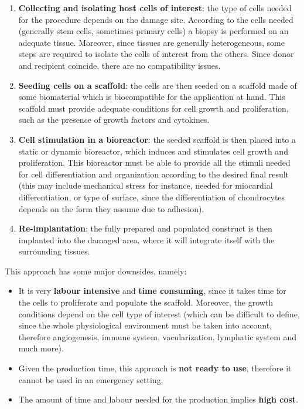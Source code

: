   \begin{multicols}{2}
    \begin{enumerate}
      \item \textbf{Collecting and isolating host cells of interest}: the type of cells needed for the procedure depends on the damage site.
        According to the cells needed (generally stem cells, sometimes primary cells) a biopsy is performed on an adequate tissue.
        Moreover, since tissues are generally heterogeneous, some steps are required to isolate the cells of interest from the others.
        Since donor and recipient coincide, there are no compatibility issues.
      \item \textbf{Seeding cells on a scaffold}: the cells are then seeded on a scaffold made of some biomaterial which is biocompatible for the application at hand.
        This scaffold must provide adequate conditions for cell growth and proliferation, such as the presence of growth factors and cytokines.
      \item \textbf{Cell stimulation in a bioreactor}: the seeded scaffold is then placed into a static or dynamic bioreactor, which induces and stimulates cell growth and proliferation.
        This bioreactor must be able to provide all the stimuli needed for cell differentiation and organization according to the desired final result (this may include mechanical stress for instance, needed for miocardial differentiation, or type of surface, since the differentiation of chondrocytes depends on the form they assume due to adhesion).
      \item \textbf{Re-implantation}: the fully prepared and populated construct is then implanted into the damaged area, where it will integrate itself with the surrounding tissues.
    \end{enumerate}
  \end{multicols}

  This approach has some major downsides, namely:

  \begin{multicols}{2}
    \begin{itemize}
      \item It is very \textbf{labour intensive} and \textbf{time consuming}, since it takes time for the cells to proliferate and populate the scaffold.
        Moreover, the growth conditions depend on the cell type of interest (which can be difficult to define, since the whole physiological environment must be taken into account, therefore angiogenesis, immune system, vacularization, lymphatic system and much more).
      \item Given the production time, this approach is \textbf{not ready to use}, therefore it cannot be used in an emergency setting.
      \item The amount of time and labour needed for the production implies \textbf{high cost}.
    \end{itemize}
  \end{multicols}

